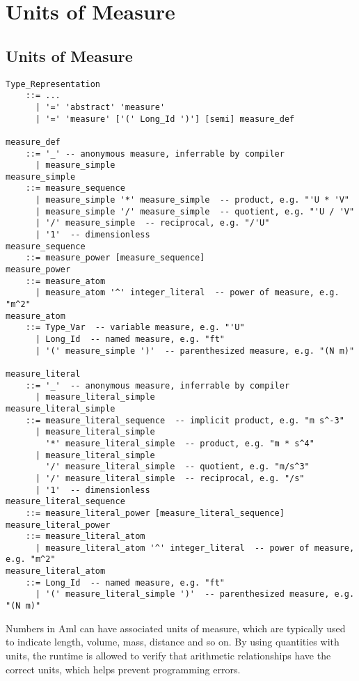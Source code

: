 
\chapter{Units of Measure}
\label{sec:units-of-measure}

\minitoc

\newpage

\section{Units of Measure}

\syntax\begin{lstlisting}
Type_Representation 
    ::= ...
      | '=' 'abstract' 'measure' 
      | '=' 'measure' ['(' Long_Id ')'] [semi] measure_def
      
measure_def 
    ::= '_' -- anonymous measure, inferrable by compiler
      | measure_simple
measure_simple
    ::= measure_sequence
      | measure_simple '*' measure_simple  -- product, e.g. "'U * 'V"
      | measure_simple '/' measure_simple  -- quotient, e.g. "'U / 'V"
      | '/' measure_simple  -- reciprocal, e.g. "/'U"
      | '1'  -- dimensionless
measure_sequence
    ::= measure_power [measure_sequence]
measure_power
    ::= measure_atom
      | measure_atom '^' integer_literal  -- power of measure, e.g. "m^2"
measure_atom
    ::= Type_Var  -- variable measure, e.g. "'U"
      | Long_Id  -- named measure, e.g. "ft"
      | '(' measure_simple ')'  -- parenthesized measure, e.g. "(N m)"
      
measure_literal
    ::= '_'  -- anonymous measure, inferrable by compiler
      | measure_literal_simple
measure_literal_simple
    ::= measure_literal_sequence  -- implicit product, e.g. "m s^-3"
      | measure_literal_simple 
        '*' measure_literal_simple  -- product, e.g. "m * s^4"
      | measure_literal_simple 
        '/' measure_literal_simple  -- quotient, e.g. "m/s^3"
      | '/' measure_literal_simple  -- reciprocal, e.g. "/s"
      | '1'  -- dimensionless
measure_literal_sequence
    ::= measure_literal_power [measure_literal_sequence]
measure_literal_power
    ::= measure_literal_atom
      | measure_literal_atom '^' integer_literal  -- power of measure, e.g. "m^2"
measure_literal_atom
    ::= Long_Id  -- named measure, e.g. "ft"
      | '(' measure_literal_simple ')'  -- parenthesized measure, e.g. "(N m)"
\end{lstlisting}

Numbers in Aml can have associated units of measure, which are typically used to indicate length, volume, mass, distance and so on. By using quantities with units, the runtime is allowed to verify that arithmetic relationships have the correct units, which helps prevent programming errors. 

